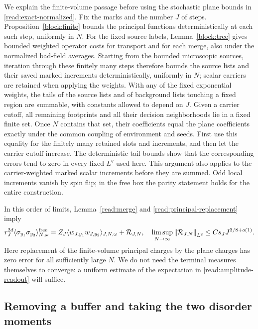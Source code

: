 We explain the finite-volume passage before using the stochastic
plane bounds in \eqref{read:exact-normalized}.  Fix the marks and the
number $J$ of steps.  Proposition~\ref{block:finite} bounds the
principal functions deterministically at each such step, uniformly
in $N$.  For the fixed source labels, Lemma~\ref{block:tree} gives
bounded weighted operator costs for transport and for each merge,
also under the normalized bad-field averages.  Starting from the
bounded microscopic sources, iteration through these finitely many
steps therefore bounds the source lists and their saved marked
increments deterministically, uniformly in $N$; scalar carriers are
retained when applying the weights.  With any of the fixed exponential
weights, the tails of the
source lists and of background lists touching a fixed region are
summable, with constants allowed to depend on $J$.  Given a carrier
cutoff, all remaining footprints and all their decision neighborhoods
lie in a fixed finite set.  Once $N$ contains that set, their
coefficients equal the plane coefficients exactly under the common
coupling of environment and seeds.  First use this equality for the
finitely many retained slots and increments, and then let the carrier
cutoff increase.  The deterministic tail bounds show that the
corresponding errors tend to zero in every fixed $L^q$ used here.
This argument also applies to the carrier-weighted marked scalar
increments before they are summed.  Odd local increments vanish by
spin flip; in the free box the parity statement holds for the entire
construction.

In this order of limits, Lemma~\ref{read:merge} and
\eqref{read:principal-replacement} imply
\begin{equation}
 r_J^{2d}\langle\sigma_{y_1}\sigma_{y_2}\rangle^{\mathrm{free}}_{N,\omega}
 =Z_J\langle w_{J,y_1}w_{J,y_2}\rangle_{J,N,\omega}
       +\mathcal R_{J,N},
 \quad
 \limsup_{N\to\infty}\left\lVert\mathcal R_{J,N}\right\rVert_{L^2}
       \le C s_JJ^{3/8+o(1)}.
 \label{read:amplitude-readout}
\end{equation}
Here replacement of the finite-volume principal charges by the plane
charges has zero error for all sufficiently large $N$.  We do not need
the terminal measures themselves to converge: a uniform estimate of
the expectation in \eqref{read:amplitude-readout} will suffice.

\subsection{Removing a buffer and taking the two disorder moments}

